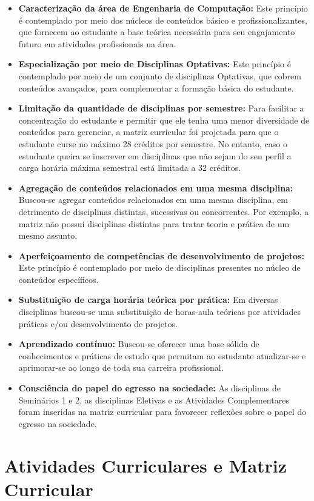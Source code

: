 \begin{itemize}
    \item \textbf{Caracterização da área de Engenharia de Computação:} Este princípio é contemplado por meio dos núcleos de conteúdos básico e profissionalizantes, que fornecem ao estudante a base teórica necessária para seu engajamento futuro em atividades profissionais na área.
    \item \textbf{Especialização por meio de Disciplinas Optativas:} Este princípio é contemplado por meio de um conjunto de disciplinas Optativas, que cobrem conteúdos avançados, para complementar a formação básica do estudante.
    \item \textbf{Limitação da quantidade de disciplinas por semestre:} Para facilitar a concentração do estudante e permitir que ele tenha uma menor diversidade de conteúdos para gerenciar, a matriz curricular foi projetada para que o estudante curse no máximo 28 créditos por semestre. No entanto, caso o estudante queira se inscrever em disciplinas que não sejam do seu perfil a carga horária máxima semestral está limitada a 32 créditos.
    \item \textbf{Agregação de conteúdos relacionados em uma mesma disciplina:} Buscou-se agregar conteúdos relacionados em uma mesma disciplina, em detrimento de disciplinas distintas, sucessivas ou concorrentes. Por exemplo, a matriz não possui disciplinas distintas para tratar teoria e prática de um mesmo assunto.
    \item \textbf{Aperfeiçoamento de competências de desenvolvimento de projetos:} Este princípio é contemplado por meio de disciplinas presentes no núcleo de conteúdos específicos.
    \item \textbf{Substituição de carga horária teórica por prática:} Em diversas disciplinas buscou-se uma substituição de horas-aula teóricas por atividades práticas e/ou desenvolvimento de projetos.
    \item \textbf{Aprendizado contínuo:} Buscou-se oferecer uma base sólida de conhecimentos e práticas de estudo que permitam ao estudante atualizar-se e aprimorar-se ao longo de toda sua carreira profissional.
    \item \textbf{Consciência do papel do egresso na sociedade:} As disciplinas de Seminários 1 e 2, as disciplinas Eletivas e as Atividades Complementares foram inseridas na matriz curricular para favorecer reflexões sobre o papel do egresso na sociedade.
\end{itemize}


\section{Atividades Curriculares e Matriz Curricular}~\label{sec:ACMC}

